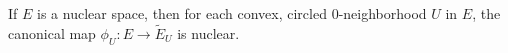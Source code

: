 If $E$ is a nuclear space, then for each convex, circled $0$-neighborhood $U$ in $E$, the canonical map $\phi_U: E \to \tilde{E}_U$ is nuclear.
